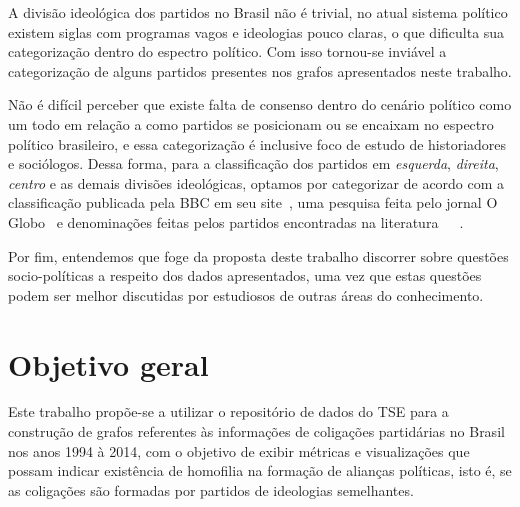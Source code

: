 A divisão ideológica dos partidos no Brasil não é trivial, no atual sistema político existem siglas com programas vagos e ideologias pouco claras, o que dificulta sua categorização dentro do espectro político. Com isso tornou-se inviável a categorização de alguns partidos presentes nos grafos apresentados neste trabalho.

Não é difícil perceber que existe falta de consenso dentro do cenário político como um todo em relação a como partidos se posicionam ou se encaixam no espectro político brasileiro, e essa categorização é inclusive foco de estudo de historiadores e sociólogos. Dessa forma, para a classificação dos partidos em \emph{esquerda}, \emph{direita}, \emph{centro} e as demais divisões ideológicas, optamos por categorizar de acordo com a classificação publicada pela BBC em seu site~\cite{shalders2017direiraesquerda}, uma pesquisa feita pelo jornal O Globo~\cite{vasconcellos2016posicionamentopartidos} e denominações feitas pelos partidos encontradas na literatura~\cite{diap2014eleicoes2014}~\cite{rocha2014comosurgiramospartidos}~\cite{senraguimaraes2016desitradacaopartidosesquerda}.

Por fim, entendemos que foge da proposta deste trabalho discorrer sobre questões socio-políticas a respeito dos dados apresentados, uma vez que estas questões podem ser melhor discutidas por estudiosos de outras áreas do conhecimento. 





\section{Objetivo geral}
\label{proposta__objetivo-geral}

Este trabalho propõe-se a utilizar o repositório de dados do \gls{TSE} para a construção de grafos referentes às informações de coligações partidárias no Brasil nos anos 1994 à 2014, com o objetivo de exibir métricas e visualizações que possam indicar existência de homofilia na formação de alianças políticas, isto é, se as coligações são formadas por partidos de ideologias semelhantes.

